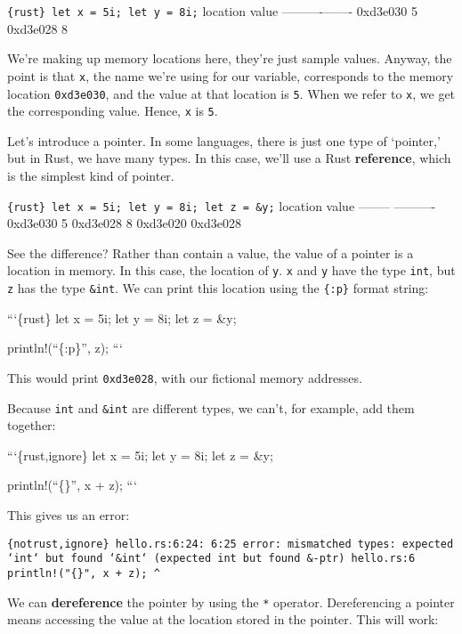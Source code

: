 \documentclass[]{article}
\begin{document}
\texttt{\{rust\} let x = 5i; let y = 8i;} \textbar{} location \textbar{}
value \textbar{} \textbar{}----------\textbar{}-------\textbar{}
\textbar{} 0xd3e030 \textbar{} 5 \textbar{} \textbar{} 0xd3e028
\textbar{} 8 \textbar{}

We're making up memory locations here, they're just sample values.
Anyway, the point is that \texttt{x}, the name we're using for our
variable, corresponds to the memory location \texttt{0xd3e030}, and the
value at that location is \texttt{5}. When we refer to \texttt{x}, we
get the corresponding value. Hence, \texttt{x} is \texttt{5}.

Let's introduce a pointer. In some languages, there is just one type of
`pointer,' but in Rust, we have many types. In this case, we'll use a
Rust \textbf{reference}, which is the simplest kind of pointer.

\texttt{\{rust\} let x = 5i; let y = 8i; let z = \&y;}
\textbar{}location \textbar{} value \textbar{} \textbar{}--------
\textbar{}----------\textbar{} \textbar{}0xd3e030 \textbar{} 5
\textbar{} \textbar{}0xd3e028 \textbar{} 8 \textbar{} \textbar{}0xd3e020
\textbar{} 0xd3e028 \textbar{}

See the difference? Rather than contain a value, the value of a pointer
is a location in memory. In this case, the location of \texttt{y}.
\texttt{x} and \texttt{y} have the type \texttt{int}, but \texttt{z} has
the type \texttt{\&int}. We can print this location using the
\texttt{\{:p\}} format string:

```\{rust\} let x = 5i; let y = 8i; let z = \&y;

println!(``\{:p\}'', z); ```

This would print \texttt{0xd3e028}, with our fictional memory addresses.

Because \texttt{int} and \texttt{\&int} are different types, we can't,
for example, add them together:

```\{rust,ignore\} let x = 5i; let y = 8i; let z = \&y;

println!(``\{\}'', x + z); ```

This gives us an error:

\texttt{\{notrust,ignore\} hello.rs:6:24: 6:25 error: mismatched types: expected `int` but found `\&int` (expected int but found \&-ptr) hello.rs:6     println!("\{\}", x + z);                                   \^{}}

We can \textbf{dereference} the pointer by using the \texttt{*}
operator. Dereferencing a pointer means accessing the value at the
location stored in the pointer. This will work:
\end{document}
